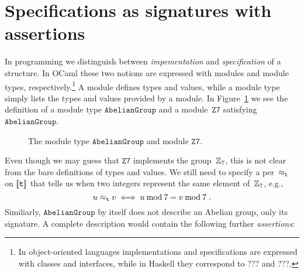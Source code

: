 \section{Specifications as signatures with assertions}
\label{sec:spec-sign-assert}


In programming we distinguish between \emph{impementation} and
\emph{specification} of a structure. In OCaml these two notions are
expressed with modules and module types, respectively.\footnote{In
  object-oriented languages implementations and specifications are
  expressed with classes and interfaces, while in Haskell they
  correspond to ??? and ???.} A module defines types
and values, while a module type simply lists the types and values provided
by a module. In Figure~\ref{fig:module-example} we see the
definition of a module type $\mathtt{AbelianGroup}$ and a
module~$\mathtt{Z7}$ satisfying~$\mathtt{AbelianGroup}$.
%
\begin{figure}
  \centering
  \caption{The module type $\mathtt{AbelianGroup}$ and module
    $\mathtt{Z7}$.}
  \label{fig:module-example}
\end{figure}
%
Even though we may guess that $\mathtt{Z7}$ implements the
group~$\mathbb{Z}_7$, this is not clear from the bare definitions of types
and values. We still need to specify a per~$\approx_{\mathtt{t}}$ on
$[\![\mathtt{t}]\!]$ that tells us when two integers represent the
same element of~$\mathbb{Z}_7$, e.g.,
%
\begin{equation*}
  u \approx_{\mathtt{t}} v \iff
  u \mathbin{\mathrm{mod}} 7 = v \mathbin{\mathrm{mod}} 7 \;.
\end{equation*}
%
Similiarly, $\mathtt{AbelianGroup}$ by itself does not describe an
Abelian group, only its signature. A complete description would
contain the following further \emph{assertions}:
%

